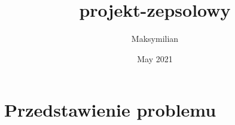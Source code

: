 \documentclass{article}
\title{projekt-zepsolowy}
\author{Maksymilian }
\date{May 2021}
\begin{document}
\maketitle

\section{Przedstawienie problemu}
\end{document}
